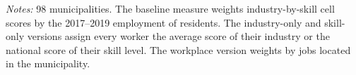 \documentclass[12pt]{article}
\begin{document}
\begin{table}[h]
\centering
\caption{Distribution of exposure across municipalities}\label{tab:variation}
\resizebox{\textwidth}{!}{}
\begin{minipage}{\textwidth}
\footnotesize \smallskip
\textit{Notes:} 98 municipalities. The baseline measure weights industry-by-skill cell scores by the 2017--2019 employment of residents. The industry-only and skill-only versions assign every worker the average score of their industry or the national score of their skill level. The workplace version weights by jobs located in the municipality.
\end{minipage}
\end{table}
\end{document}
